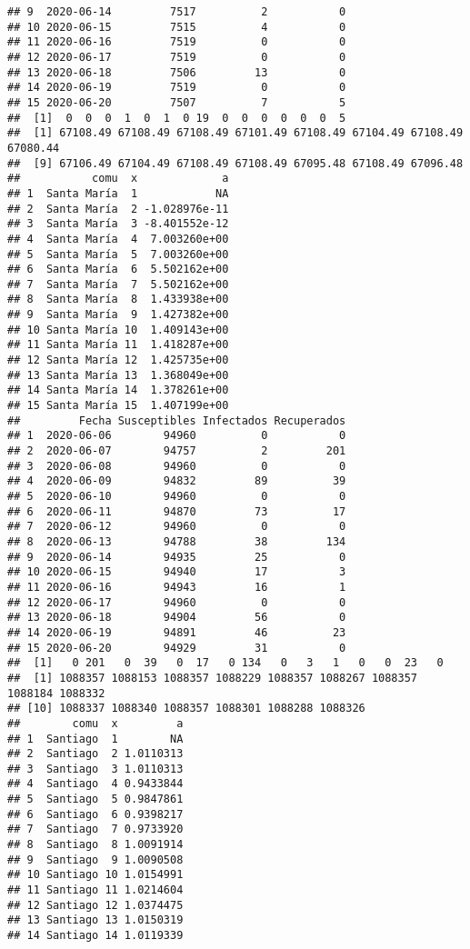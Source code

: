 \documentclass[
]{article}
\begin{document}
\begin{verbatim}
## 9  2020-06-14         7517          2           0
## 10 2020-06-15         7515          4           0
## 11 2020-06-16         7519          0           0
## 12 2020-06-17         7519          0           0
## 13 2020-06-18         7506         13           0
## 14 2020-06-19         7519          0           0
## 15 2020-06-20         7507          7           5
##  [1]  0  0  0  1  0  1  0 19  0  0  0  0  0  0  5
##  [1] 67108.49 67108.49 67108.49 67101.49 67108.49 67104.49 67108.49 67080.44
##  [9] 67106.49 67104.49 67108.49 67108.49 67095.48 67108.49 67096.48
##           comu  x             a
## 1  Santa María  1            NA
## 2  Santa María  2 -1.028976e-11
## 3  Santa María  3 -8.401552e-12
## 4  Santa María  4  7.003260e+00
## 5  Santa María  5  7.003260e+00
## 6  Santa María  6  5.502162e+00
## 7  Santa María  7  5.502162e+00
## 8  Santa María  8  1.433938e+00
## 9  Santa María  9  1.427382e+00
## 10 Santa María 10  1.409143e+00
## 11 Santa María 11  1.418287e+00
## 12 Santa María 12  1.425735e+00
## 13 Santa María 13  1.368049e+00
## 14 Santa María 14  1.378261e+00
## 15 Santa María 15  1.407199e+00
##         Fecha Susceptibles Infectados Recuperados
## 1  2020-06-06        94960          0           0
## 2  2020-06-07        94757          2         201
## 3  2020-06-08        94960          0           0
## 4  2020-06-09        94832         89          39
## 5  2020-06-10        94960          0           0
## 6  2020-06-11        94870         73          17
## 7  2020-06-12        94960          0           0
## 8  2020-06-13        94788         38         134
## 9  2020-06-14        94935         25           0
## 10 2020-06-15        94940         17           3
## 11 2020-06-16        94943         16           1
## 12 2020-06-17        94960          0           0
## 13 2020-06-18        94904         56           0
## 14 2020-06-19        94891         46          23
## 15 2020-06-20        94929         31           0
##  [1]   0 201   0  39   0  17   0 134   0   3   1   0   0  23   0
##  [1] 1088357 1088153 1088357 1088229 1088357 1088267 1088357 1088184 1088332
## [10] 1088337 1088340 1088357 1088301 1088288 1088326
##        comu  x         a
## 1  Santiago  1        NA
## 2  Santiago  2 1.0110313
## 3  Santiago  3 1.0110313
## 4  Santiago  4 0.9433844
## 5  Santiago  5 0.9847861
## 6  Santiago  6 0.9398217
## 7  Santiago  7 0.9733920
## 8  Santiago  8 1.0091914
## 9  Santiago  9 1.0090508
## 10 Santiago 10 1.0154991
## 11 Santiago 11 1.0214604
## 12 Santiago 12 1.0374475
## 13 Santiago 13 1.0150319
## 14 Santiago 14 1.0119339

\end{verbatim}
\end{document}
